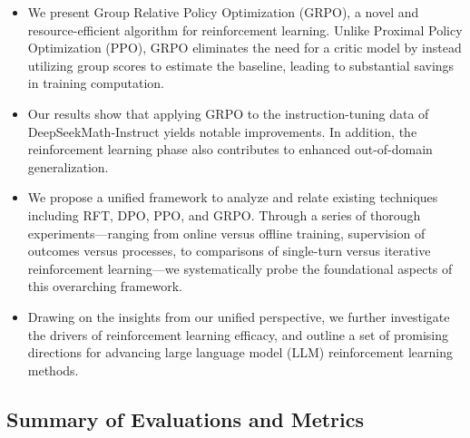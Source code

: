 \begin{itemize}[topsep=0pt]
    \item We present Group Relative Policy Optimization (GRPO), a novel and resource-efficient algorithm for reinforcement learning. Unlike Proximal Policy Optimization (PPO), GRPO eliminates the need for a critic model by instead utilizing group scores to estimate the baseline, leading to substantial savings in training computation.
    \item Our results show that applying GRPO to the instruction-tuning data of DeepSeekMath-Instruct yields notable improvements. In addition, the reinforcement learning phase also contributes to enhanced out-of-domain generalization.
    \item We propose a unified framework to analyze and relate existing techniques including RFT, DPO, PPO, and GRPO. Through a series of thorough experiments—ranging from online versus offline training, supervision of outcomes versus processes, to comparisons of single-turn versus iterative reinforcement learning—we systematically probe the foundational aspects of this overarching framework.
    \item Drawing on the insights from our unified perspective, we further investigate the drivers of reinforcement learning efficacy, and outline a set of promising directions for advancing large language model (LLM) reinforcement learning methods.
\end{itemize}

\subsection{Summary of Evaluations and Metrics}

